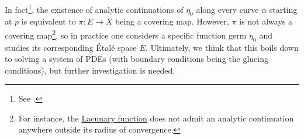 \documentclass[../Moduli_Spaces_of_Riemann_Surfaces.tex]{subfiles}
\begin{document}
    \begin{remark}
        In fact\footnote{See \cite[][Exercise 7.2]{forster}.}, the existence of analytic continuations of $\eta_0$ along every curve $\alpha$ starting at $p$ is equivalent to $\pi:E\to X$ being a covering map. However, $\pi$ is not always a covering map\footnote{For instance, the \href{https://en.wikipedia.org/wiki/Lacunary_function}{Lacunary function} does not admit an analytic continuation anywhere outside its radius of convergence.}, so in practice one considers a specific function germ $\eta_0$ and studies its corresponding Étalé space $E$. Ultimately, we think that this boils down to solving a system of PDEs (with boundary conditions being the glueing conditions), but further investigation is needed.\exqed
    \end{remark}
\end{document}
